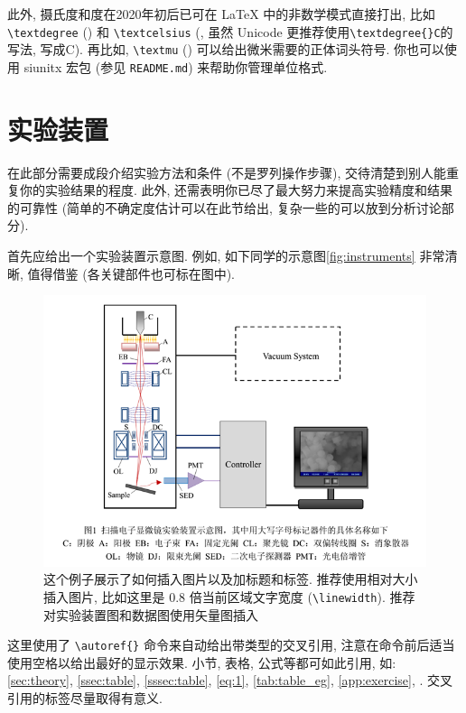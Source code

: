 \documentclass[notofandol]{mpltx}
\newcommand{\note}[1]{{\color{gray}#1}}
\begin{document}
\note{此外, 摄氏度和度在2020年初后已可在 \LaTeX{} 中的非数学模式直接打出, 比如 \texttt{\textbackslash{}textdegree} (\textdegree) 和 \texttt{\textbackslash{}textcelsius} (\textcelsius, 虽然 Unicode 更推荐使用\texttt{\textbackslash{}textdegree\{\}C}的写法, 写成\textdegree{}C).
    再比如, \texttt{\textbackslash{}textmu} (\textmu) 可以给出微米需要的正体词头符号.
    你也可以使用 \textsf{siunitx} 宏包 (参见 \texttt{README.md}) 来帮助你管理单位格式.}

\section{实验装置}
在此部分需要成段介绍实验方法和条件 (不是罗列操作步骤), 交待清楚到别人能重复你的实验结果的程度.
此外, 还需表明你已尽了最大努力来提高实验精度和结果的可靠性 (简单的不确定度估计可以在此节给出, 复杂一些的可以放到分析讨论部分).

首先应给出一个实验装置示意图.
例如, 如下同学的示意图\autoref{fig:instruments} 非常清晰, 值得借鉴 (各关键部件也可标在图中).

\begin{figure}
    \centering
    \includegraphics[width=0.85\linewidth]{fig/instruments.png}
    \caption{这个例子展示了如何插入图片以及加标题和标签.
        \note{推荐使用相对大小插入图片, 比如这里是 0.8 倍当前区域文字宽度 (\texttt{\textbackslash{}linewidth}).
            推荐对实验装置图和数据图使用矢量图插入}}
    \label{fig:instruments}
\end{figure}

\note{这里使用了 \texttt{\textbackslash{}autoref\{\}} 命令来自动给出带类型的交叉引用, 注意在命令前后适当使用空格以给出最好的显示效果.
    小节, 表格, 公式等都可如此引用, 如: \autoref{sec:theory}, \autoref{ssec:table}, \autoref{sssec:table}, \autoref{eq:1}, \autoref{tab:table_eg}, \autoref{app:exercise}, \autopageref{tab:table_eg}.
    交叉引用的标签尽量取得有意义.}
\end{document}
